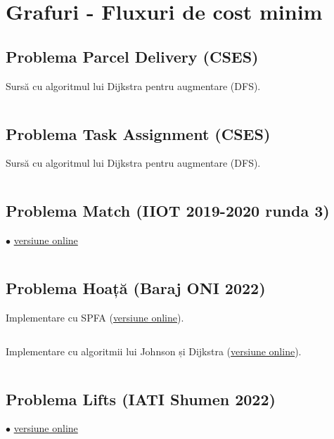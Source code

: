 \documentclass[../main.tex]{subfiles}
\begin{document}
\chapter{Grafuri - Fluxuri de cost minim}

\section{Problema Parcel Delivery (CSES)}
\label{code:parcel-delivery}

Sursă cu algoritmul lui Dijkstra pentru augmentare (DFS).

\inputminted{cpp}{../src/graphs/parcel-delivery.cpp}


\section{Problema Task Assignment (CSES)}
\label{code:task-assignment}

Sursă cu algoritmul lui Dijkstra pentru augmentare (DFS).

\inputminted{cpp}{../src/graphs/task-assignment-flow.cpp}


\section{Problema Match (IIOT 2019-2020 runda 3)}
\label{code:match}
$\bullet$
\href{https://kilonova.ro/submissions/1119299}{versiune online}

\inputminted{cpp}{../src/graphs/match.cpp}


\section{Problema Hoață (Baraj ONI 2022)}
\label{code:hoata}

Implementare cu SPFA (\href{https://kilonova.ro/submissions/1119688}{versiune online}).

\inputminted{cpp}{../src/graphs/hoata-spfa.cpp}

Implementare cu algoritmii lui Johnson și Dijkstra (\href{https://kilonova.ro/submissions/1119807}{versiune online}).

\inputminted{cpp}{../src/graphs/hoata-johnson.cpp}


\section{Problema Lifts (IATI Shumen 2022)}
\label{code:lifts}
$\bullet$
\href{https://kilonova.ro/submissions/1120339}{versiune online}

\inputminted{cpp}{../src/graphs/lifts.cpp}
\end{document}
